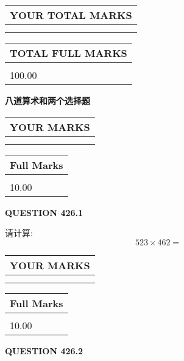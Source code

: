 \documentclass{ctexart}
\begin{document}
   
\vspace{0.2in}\noindent\begin{tabular}{|l|}
\hline
YOUR TOTAL MARKS  \\
\hline
 \\ 
 \\ 
\hline
\end{tabular}
\hspace{0.05in} \begin{tabular}{|l|}
\hline
TOTAL FULL MARKS  \\
\hline
 \\ 
100.00 \\
\hline
\end{tabular}
   
   
 \vspace{0.2in}
{\LARGE {\textbf{ 八道算术和两个选择题}}}
   
   
  
\vspace{0.2in}
  
\noindent\begin{tabular}{|l|}
\hline
 YOUR MARKS  \\
\hline
 \\ 
 \\ 
\hline
\end{tabular}
\hspace{0.05in} \begin{tabular}{|l|}
\hline
 Full Marks  \\
\hline
 \\ 
10.00 \\
\hline
\end{tabular}
{\textbf{\Large{QUESTION
426.1 
}}}
  
  
 
请计算:
\begin{equation}
523  \times    %
462 = \nonumber
\end{equation}
 

 

 
  
\vspace{0.2in}
  
\noindent\begin{tabular}{|l|}
\hline
 YOUR MARKS  \\
\hline
 \\ 
 \\ 
\hline
\end{tabular}
\hspace{0.05in} \begin{tabular}{|l|}
\hline
 Full Marks  \\
\hline
 \\ 
10.00 \\
\hline
\end{tabular}
{\textbf{\Large{QUESTION
426.2 
}}}
  
\end{document}
